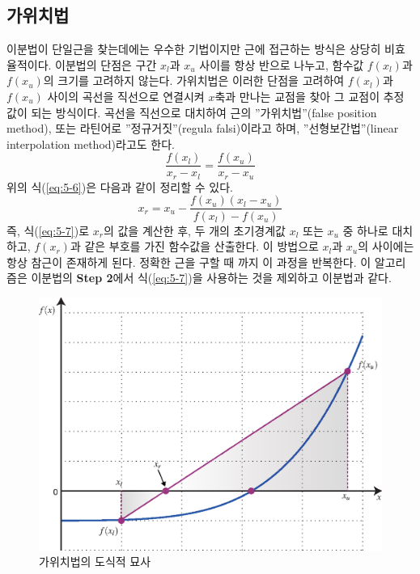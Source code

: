 \subsection{가위치법}
이분법이 단일근을 찾는데에는 우수한 기법이지만 근에 접근하는 방식은 상당히 비효율적이다. 이분법의 단점은 구간 $x_{l}$과 $x_{u}$ 사이를 항상 반으로 나누고, 함수값 $f(x_{l})$과 $f(x_{u})$의 크기를 고려하지 않는다. 가위치법은 이러한 단점을 고려하여 $f(x_{l})$과 $f(x_{u})$ 사이의 곡선을 직선으로 연결시켜 $x$축과 만나는 교점을 찾아 그 교점이 추정값이 되는 방식이다. 곡선을 직선으로 대치하여 근의 \textsf{''가위치법''}(false position method), 또는 라틴어로 \textsf{''정규거짓''}(regula falsi)이라고 하며, \textsf{''선형보간법''}(linear interpolation method)라고도 한다.
\begin{equation}\label{eq:5-6}
\frac{f(x_{l})}{x_{r}-x_{l}}=\frac{f(x_{u})}{x_{r}-x_{u}}
\end{equation}
위의 식(\ref{eq:5-6})은 다음과 같이 정리할 수 있다.
\begin{equation}\label{eq:5-7}
x_{r}=x_{u}-\frac{f(x_{u})(x_l -x_u)}{f(x_l)-f(x_u)}
\end{equation}
\clearpage
즉, 식(\ref{eq:5-7})로 $x_{r}$의 값을 계산한 후, 두 개의 초기경계값 $x_{l}$ 또는 $x_{u}$ 중 하나로 대치하고, $f(x_{r})$과 같은 부호를 가진 함수값을 산출한다. 이 방법으로 $x_{l}$과 $x_{u}$의 사이에는 항상 참근이 존재하게 된다. 정확한 근을 구할 때 까지 이 과정을 반복한다. 이 알고리즘은 이분법의 \textbf{Step 2}에서 식(\ref{eq:5-7})을 사용하는 것을 제외하고 이분법과 같다.

\begin{figure}[!hbpt]
\centering
\includegraphics[keepaspectratio=true,width=0.6\linewidth]{figs/fpm1.eps}
\caption{가위치법의 도식적 묘사}
\label{fig:5-12}
\end{figure}


